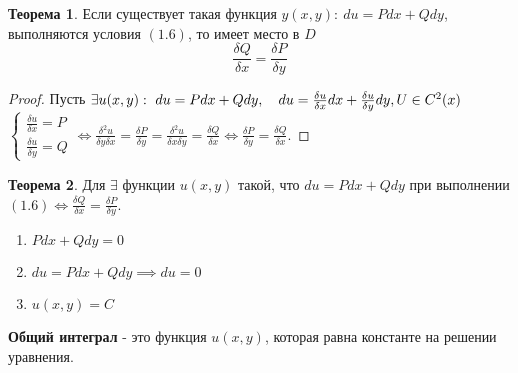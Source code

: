 \documentclass{report}
\theoremstyle{definition}
\newtheorem{theorem}{Теорема}[section]
\begin{document}
\begin{theorem}
    Если существует такая функция $y(x,y): \ du = Pdx + Qdy$, выполняются условия $(1.6)$, то имеет место в $D$
    \begin{equation}
        \frac{\delta Q}{\delta x} = \frac{\delta P}{\delta y}
    \end{equation}
\end{theorem}

\begin{proof}
    Пусть $\exists u(x,y): \ du = Pdx + Qdy, \quad du = \frac{\delta u}{\delta x}dx + \frac{\delta u}{\delta y}dy,\\ U\in C^2(x)$ \\

    $\left\{\begin{array}{l}
            \frac{\delta u}{\delta x} = P \\
            \frac{\delta u}{\delta y} = Q
        \end{array}\right. \iff \frac{\delta^2 u}{\delta y \delta x} = \frac{\delta P}{\delta y} = \frac{\delta^2 u}{\delta x \delta y} = \frac{\delta Q}{\delta x} \iff \frac{\delta P}{\delta y} = \frac{\delta Q}{\delta x}$.
\end{proof}

\begin{theorem}
    Для $\exists$ функции $u(x,y)$ такой, что $du = Pdx + Qdy$ при выполнении $(1.6) \iff \frac{\delta Q}{\delta x} = \frac{\delta P}{\delta y}$.
    \begin{enumerate}
        \item $Pdx + Qdy = 0$
        \item $du = Pdx + Qdy \implies du = 0$
        \item $u(x,y) = C$
    \end{enumerate}

    \textbf{Общий интеграл} - это функция $u(x,y)$, которая равна константе на решении уравнения.
\end{theorem}
\end{document}
